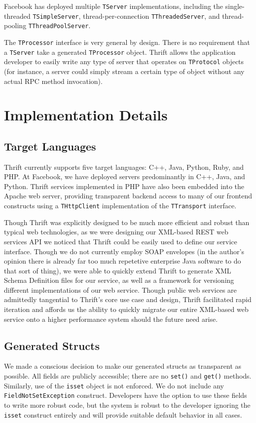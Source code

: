 \documentclass[nocopyrightspace,blockstyle]{sigplanconf}
\begin{document}
Facebook has deployed multiple \texttt{TServer} implementations, including
the single-threaded \texttt{TSimpleServer}, thread-per-connection
\texttt{TThreadedServer}, and thread-pooling \texttt{TThreadPoolServer}.

The \texttt{TProcessor} interface is very general by design. There is no
requirement that a \texttt{TServer} take a generated \texttt{TProcessor}
object. Thrift allows the application developer to easily write any type of
server that operates on \texttt{TProtocol} objects (for instance, a server
could simply stream a certain type of object without any actual RPC method
invocation).

\section{Implementation Details}
\subsection{Target Languages}
Thrift currently supports five target languages: C++, Java, Python, Ruby, and
PHP. At Facebook, we have deployed servers predominantly in C++, Java, and
Python. Thrift services implemented in PHP have also been embedded into the
Apache web server, providing transparent backend access to many of our
frontend constructs using a \texttt{THttpClient} implementation of the
\texttt{TTransport} interface.

Though Thrift was explicitly designed to be much more efficient and robust
than typical web technologies, as we were designing our XML-based REST web
services API we noticed that Thrift could be easily used to define our
service interface. Though we do not currently employ SOAP envelopes (in the
author's opinion there is already far too much repetetive enterprise Java
software to do that sort of thing), we were able to quickly extend Thrift to
generate XML Schema Definition files for our service, as well as a framework
for versioning different implementations of our web service. Though public
web services are admittedly tangential to Thrift's core use case and design,
Thrift facilitated rapid iteration and affords us the ability to quickly
migrate our entire XML-based web service onto a higher performance system
should the future need arise.

\subsection{Generated Structs}
We made a conscious decision to make our generated structs as transparent as
possible. All fields are publicly accessible; there are no \texttt{set()} and
\texttt{get()} methods. Similarly, use of the \texttt{isset} object is not
enforced. We do not include any \texttt{FieldNotSetException} construct.
Developers have the option to use these fields to write more robust code, but
the system is robust to the developer ignoring the \texttt{isset} construct
entirely and will provide suitable default behavior in all cases.
\end{document}
